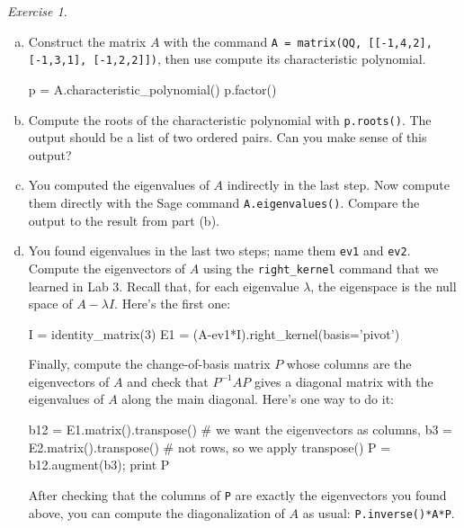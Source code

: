 \documentclass[fleqn,11pt]{paper}
\theoremstyle{remark}
\newtheorem{exercise}{Exercise}
\newcommand{\<}{\ensuremath{\langle}}
\renewcommand{\>}{\ensuremath{\rangle}}
\begin{document}
\begin{exercise}
\begin{enumerate}[(a)]
\item Construct the matrix $A$ with the command \verb|A = matrix(QQ, [[-1,4,2], [-1,3,1], [-1,2,2]])|, 
then use compute its characteristic polynomial.
\begin{sageblock}
  p = A.characteristic_polynomial()
  p.factor()
\end{sageblock}
\item Compute the roots of the characteristic polynomial
  with \verb|p.roots()|.  
  The output should be a list of two ordered pairs.  
  Can you make sense of this output?
\item You computed the eigenvalues of $A$ indirectly in the last step. Now compute them directly
with the Sage command \verb|A.eigenvalues()|. Compare the output to the result from part (b).
\item You found eigenvalues in the last two steps; name them \verb|ev1| and \verb|ev2|.
Compute the eigenvectors of $A$ using the \verb|right_kernel| command that we learned in
Lab 3. Recall that, 
for each eigenvalue $\lambda$, the eigenspace is the null space of $A - \lambda I$.
Here's the first one: %
\begin{sageblock}
I = identity_matrix(3)
E1 = (A-ev1*I).right_kernel(basis=’pivot’)
\end{sageblock}
Finally, compute the change-of-basis matrix $P$ whose columns are the eigenvectors of $A$ and
check that $P^{-1}A P$ gives a diagonal matrix with the eigenvalues of $A$ along the main diagonal.
Here's one way to do it:
\begin{sageblock}
b12 = E1.matrix().transpose()    # we want the eigenvectors as columns,
b3 = E2.matrix().transpose()     # not rows, so we apply transpose() 
P = b12.augment(b3); print P     
\end{sageblock}
After checking that the columns of \verb|P| are exactly the eigenvectors you found above,
you can compute the diagonalization of $A$ as usual: \verb|P.inverse()*A*P|.
\end{enumerate}

\end{exercise}
\end{document}

